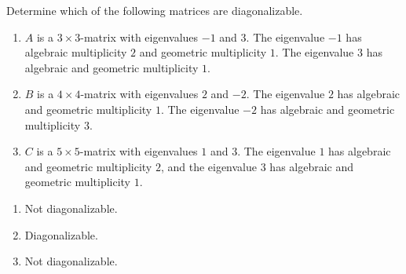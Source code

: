 \documentclass{ximera}
\begin{document}
\begin{exercise}
  Determine which of the following matrices are diagonalizable.
  \begin{enumerate}
  \item $A$ is a $3\times 3$-matrix with eigenvalues $-1$ and $3$. The
    eigenvalue $-1$ has algebraic multiplicity $2$ and geometric
    multiplicity $1$. The eigenvalue $3$ has algebraic and geometric
    multiplicity $1$.
  \item $B$ is a $4\times 4$-matrix with eigenvalues $2$ and $-2$. The
    eigenvalue $2$ has algebraic and geometric multiplicity $1$. The
    eigenvalue $-2$ has algebraic and geometric multiplicity $3$.
  \item $C$ is a $5\times 5$-matrix with eigenvalues $1$ and $3$. The
    eigenvalue $1$ has algebraic and geometric multiplicity $2$, and
    the eigenvalue $3$ has algebraic and geometric multiplicity $1$.
  \end{enumerate}
  \begin{solution}
    \begin{enumerate}
    \item Not diagonalizable.
    \item Diagonalizable.
    \item Not diagonalizable.
    \end{enumerate}
  \end{solution}
\end{exercise}
\end{document}
